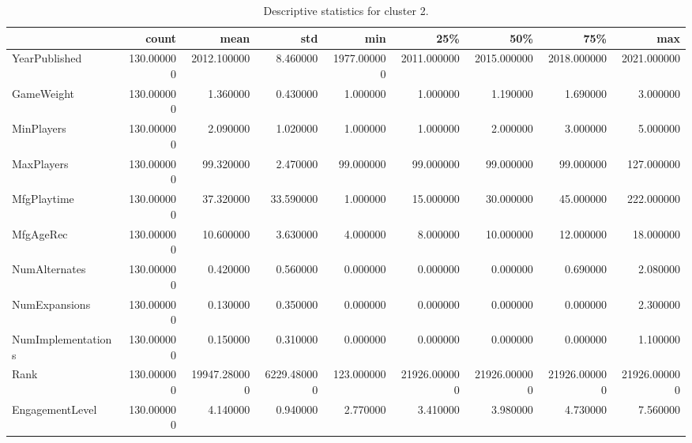 \begin{table}
\caption{Descriptive statistics for cluster 2.}
\label{tab:cluster_2_describe}
\begin{tabular}{lrrrrrrrr}
\toprule
 & count & mean & std & min & 25\% & 50\% & 75\% & max \\
\midrule
YearPublished & 130.000000 & 2012.100000 & 8.460000 & 1977.000000 & 2011.000000 & 2015.000000 & 2018.000000 & 2021.000000 \\
GameWeight & 130.000000 & 1.360000 & 0.430000 & 1.000000 & 1.000000 & 1.190000 & 1.690000 & 3.000000 \\
MinPlayers & 130.000000 & 2.090000 & 1.020000 & 1.000000 & 1.000000 & 2.000000 & 3.000000 & 5.000000 \\
MaxPlayers & 130.000000 & 99.320000 & 2.470000 & 99.000000 & 99.000000 & 99.000000 & 99.000000 & 127.000000 \\
MfgPlaytime & 130.000000 & 37.320000 & 33.590000 & 1.000000 & 15.000000 & 30.000000 & 45.000000 & 222.000000 \\
MfgAgeRec & 130.000000 & 10.600000 & 3.630000 & 4.000000 & 8.000000 & 10.000000 & 12.000000 & 18.000000 \\
NumAlternates & 130.000000 & 0.420000 & 0.560000 & 0.000000 & 0.000000 & 0.000000 & 0.690000 & 2.080000 \\
NumExpansions & 130.000000 & 0.130000 & 0.350000 & 0.000000 & 0.000000 & 0.000000 & 0.000000 & 2.300000 \\
NumImplementations & 130.000000 & 0.150000 & 0.310000 & 0.000000 & 0.000000 & 0.000000 & 0.000000 & 1.100000 \\
Rank & 130.000000 & 19947.280000 & 6229.480000 & 123.000000 & 21926.000000 & 21926.000000 & 21926.000000 & 21926.000000 \\
EngagementLevel & 130.000000 & 4.140000 & 0.940000 & 2.770000 & 3.410000 & 3.980000 & 4.730000 & 7.560000 \\
\bottomrule
\end{tabular}
\end{table}
